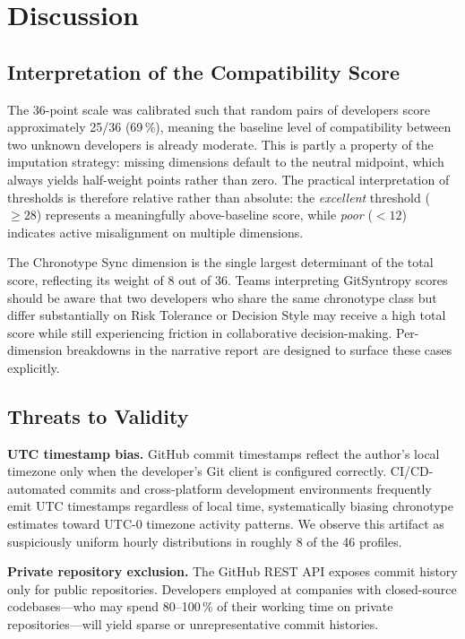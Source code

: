 \documentclass[conference]{IEEEtran}
\begin{document}
\section{Discussion}
\label{sec:discuss}

\subsection{Interpretation of the Compatibility Score}

The 36-point scale was calibrated such that random pairs of
developers score approximately 25/36 (69\,\%), meaning the baseline
level of compatibility between two unknown developers is already
moderate.  This is partly a property of the imputation strategy:
missing dimensions default to the neutral midpoint, which always
yields half-weight points rather than zero.  The practical
interpretation of thresholds is therefore relative rather than
absolute: the \textit{excellent} threshold ($\geq 28$) represents
a meaningfully above-baseline score, while \textit{poor} ($< 12$)
indicates active misalignment on multiple dimensions.

The Chronotype Sync dimension is the single largest determinant of
the total score, reflecting its weight of 8 out of 36.  Teams
interpreting GitSyntropy scores should be aware that two developers
who share the same chronotype class but differ substantially on
Risk Tolerance or Decision Style may receive a high total score
while still experiencing friction in collaborative decision-making.
Per-dimension breakdowns in the narrative report are designed to
surface these cases explicitly.

\subsection{Threats to Validity}

\textbf{UTC timestamp bias.}  GitHub commit timestamps reflect the
author's local timezone only when the developer's Git client is
configured correctly.  CI/CD-automated commits and cross-platform
development environments frequently emit UTC timestamps regardless
of local time, systematically biasing chronotype estimates toward
UTC-0 timezone activity patterns.  We observe this artifact as
suspiciously uniform hourly distributions in roughly 8 of the
46 profiles.

\textbf{Private repository exclusion.}  The GitHub REST API exposes
commit history only for public repositories.  Developers employed
at companies with closed-source codebases---who may spend 80--100\,\%
of their working time on private repositories---will yield sparse
or unrepresentative commit histories.
\end{document}

